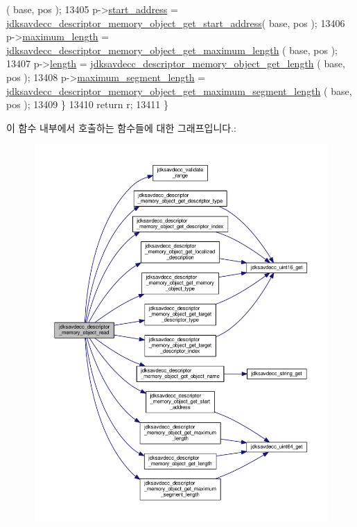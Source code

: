 \begin{DoxyCode}
      ( base, pos );
13405         p->\hyperlink{structjdksavdecc__descriptor__memory__object_a435fb25eb186ac591e661f3f1253de25}{start\_address} = 
      \hyperlink{group__descriptor__memory__object_ga282dc0761ca0dd00fb26cdab52d2bd24}{jdksavdecc\_descriptor\_memory\_object\_get\_start\_address}(
       base, pos );
13406         p->\hyperlink{structjdksavdecc__descriptor__memory__object_a8dac25844edd7e5d8700e9d8dd2427a3}{maximum\_length} = 
      \hyperlink{group__descriptor__memory__object_ga95fdaeb40e9131d32a2f1c735e7eaf54}{jdksavdecc\_descriptor\_memory\_object\_get\_maximum\_length}
      ( base, pos );
13407         p->\hyperlink{structjdksavdecc__descriptor__memory__object_a190b76b1f3d5bd26920300e5f073739b}{length} = \hyperlink{group__descriptor__memory__object_gab5f8a35ab8a52ab9f7fac1a64159d07e}{jdksavdecc\_descriptor\_memory\_object\_get\_length}
      ( base, pos );
13408         p->\hyperlink{structjdksavdecc__descriptor__memory__object_ad3a8958ab9a1311bfdbe722130bb3944}{maximum\_segment\_length} = 
      \hyperlink{group__descriptor__memory__object_ga1943dfa8f47638d4986e654391c0e2f4}{jdksavdecc\_descriptor\_memory\_object\_get\_maximum\_segment\_length}
      ( base, pos );
13409     \}
13410     \textcolor{keywordflow}{return} r;
13411 \}
\end{DoxyCode}


이 함수 내부에서 호출하는 함수들에 대한 그래프입니다.\+:
\nopagebreak
\begin{figure}[H]
\begin{center}
\leavevmode
\includegraphics[width=350pt]{group__descriptor__memory__object_ga0eaaafc720b2652958e03a4791d990a0_cgraph}
\end{center}
\end{figure}


